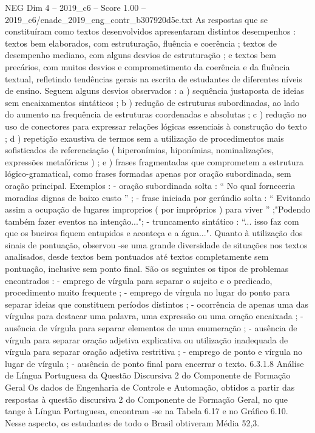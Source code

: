 \begin{textsample}{NEG Dim 4 – 2019\_c6 – Score 1.00 – 2019\_c6/enade\_2019\_eng\_contr\_b307920d5e.txt}
As respostas que se constituíram como textos desenvolvidos apresentaram distintos desempenhos : textos bem elaborados, com estruturação, fluência e coerência ; textos de desempenho mediano, com alguns desvios de estruturação ; e textos bem precários, com muitos desvios e comprometimento da coerência e da fluência textual, refletindo tendências gerais na escrita de estudantes de diferentes níveis de ensino.
Seguem alguns desvios observados : a ) sequência justaposta de ideias sem encaixamentos sintáticos ; b ) redução de estruturas subordinadas, ao lado do aumento na frequência de estruturas coordenadas e absolutas ; c ) redução no uso de conectores para expressar relações lógicas essenciais à construção do texto ; d ) repetição exaustiva de termos sem a utilização de procedimentos mais sofisticados de referenciação ( hiperonímias, hiponímias, nominalizações, expressões metafóricas ) ; e ) frases fragmentadas que comprometem a estrutura lógico-gramatical, como frases formadas apenas por oração subordinada, sem oração principal.
Exemplos : - oração subordinada solta : “ No qual forneceria moradias dignas de baixo custo ” ; - frase iniciada por gerúndio solta : “ Evitando assim a ocupação de lugares improprios ( por impróprios ) para viver ” ;"Podendo também fazer eventos na intenção..."; - truncamento sintático : “... isso faz com que os bueiros fiquem entupidos e aconteça e a água...".
Quanto à utilização dos sinais de pontuação, observou -se uma grande diversidade de situações nos textos analisados, desde textos bem pontuados até textos completamente sem pontuação, inclusive sem ponto final.
São os seguintes os tipos de problemas encontrados : - emprego de vírgula para separar o sujeito e o predicado, procedimento muito frequente ; - emprego de vírgula no lugar do ponto para separar ideias que constituem períodos distintos ; - ocorrência de apenas uma das vírgulas para destacar uma palavra, uma expressão ou uma oração encaixada ; - ausência de vírgula para separar elementos de uma enumeração ; - ausência de vírgula para separar oração adjetiva explicativa ou utilização inadequada de vírgula para separar oração adjetiva restritiva ; - emprego de ponto e vírgula no lugar de vírgula ; - ausência de ponto final para encerrar o texto. 6.3.1.8 Análise de Língua Portuguesa da Questão Discursiva 2 do Componente de Formação Geral Os dados de Engenharia de Controle e Automação, obtidos a partir das respostas à questão discursiva 2 do Componente de Formação Geral, no que tange à Língua Portuguesa, encontram -se na Tabela 6.17 e no Gráfico 6.10.
Nesse aspecto, os estudantes de todo o Brasil obtiveram Média 52,3.

\end{textsample}
